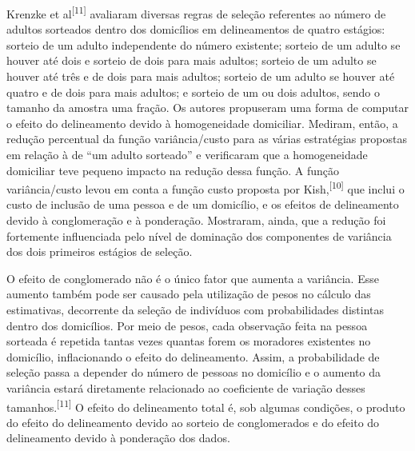 \documentclass{article}
\begin{document}
Krenzke et al\textsuperscript{[}\textsuperscript{11}\textsuperscript{]}
avaliaram diversas regras de seleção referentes ao número de adultos sorteados
dentro dos domicílios em delineamentos de quatro estágios: sorteio de um adulto
independente do número existente; sorteio de um adulto se houver até dois e
sorteio de dois para mais adultos; sorteio de um adulto se houver até três e de
dois para mais adultos; sorteio de um adulto se houver até quatro e de dois para
mais adultos; e sorteio de um ou dois adultos, sendo o tamanho da amostra uma
fração. Os autores propuseram uma forma de computar o efeito do delineamento
devido à homogeneidade domiciliar. Mediram, então, a redução percentual da
função variância/custo para as várias estratégias propostas em relação à de “um
adulto sorteado” e verificaram que a homogeneidade domiciliar teve pequeno
impacto na redução dessa função. A função variância/custo levou em conta a
função custo proposta por Kish,\textsuperscript{[}\textsuperscript{10}\textsuperscript{]}
que inclui o custo de inclusão de uma pessoa e de um domicílio, e os efeitos de
delineamento devido à conglomeração e à ponderação. Mostraram, ainda, que a
redução foi fortemente influenciada pelo nível de dominação dos componentes de
variância dos dois primeiros estágios de seleção.

O efeito de conglomerado não é o único fator que aumenta a variância. Esse
aumento também pode ser causado pela utilização de pesos no cálculo das
estimativas, decorrente da seleção de indivíduos com probabilidades distintas
dentro dos domicílios. Por meio de pesos, cada observação feita na pessoa
sorteada é repetida tantas vezes quantas forem os moradores existentes no
domicílio, inflacionando o efeito do delineamento. Assim, a probabilidade de
seleção passa a depender do número de pessoas no domicílio e o aumento da
variância estará diretamente relacionado ao coeficiente de variação desses
tamanhos.\textsuperscript{[}\textsuperscript{11}\textsuperscript{]}
O efeito do delineamento total é, sob algumas condições, o produto do efeito do
delineamento devido ao sorteio de conglomerados e do efeito do delineamento
devido à ponderação dos dados.
\end{document}
